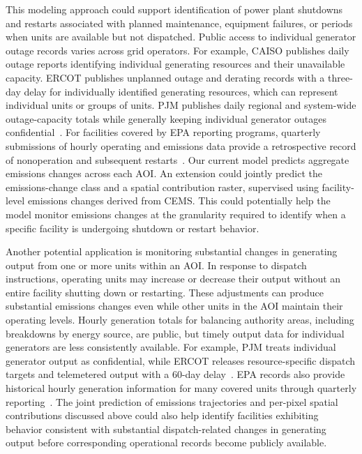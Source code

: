 \documentclass[sigconf,nonacm]{acmart}
\begin{document}
This modeling approach could support identification of power plant shutdowns and
restarts associated with planned maintenance, equipment failures, or periods when
units are available but not dispatched. Public access to individual generator
outage records varies across grid operators. For example, CAISO publishes daily
outage reports identifying individual generating resources and their unavailable
capacity. ERCOT publishes unplanned outage and derating records with a three-day
delay for individually identified generating resources, which can represent
individual units or groups of units. PJM publishes daily regional and system-wide
outage-capacity totals while generally keeping individual generator outages
confidential~\cite{caiso2026outages,ercot2026unplannedOutages,pjm2026dataAvailability}.
For facilities covered by EPA reporting programs, quarterly submissions of hourly
operating and emissions data provide a retrospective record of nonoperation and
subsequent restarts~\cite{epa2026powerSectorGuide,epa2026powerSectorData}. Our current
model predicts aggregate emissions changes across each AOI. An extension could
jointly predict the emissions-change class and a spatial contribution raster,
supervised using facility-level emissions changes derived from CEMS. This could
potentially help the model monitor emissions changes at the granularity required
to identify when a specific facility is undergoing shutdown or restart behavior.

Another potential application is monitoring substantial changes in generating
output from one or more units within an AOI. In response to dispatch instructions,
operating units may increase or decrease their output without an entire facility
shutting down or restarting. These adjustments can produce substantial emissions
changes even while other units in the AOI maintain their operating levels. Hourly
generation totals for balancing authority areas, including breakdowns by energy
source, are public, but timely output data for individual generators are less
consistently available. For example, PJM treats individual generator output as
confidential, while ERCOT releases resource-specific dispatch targets and
telemetered output with a 60-day delay~\cite{eia2026hourlyGrid,pjm2026dataAvailability,ercot2026dispatchDisclosure}.
EPA records also provide historical hourly generation information for many covered
units through quarterly reporting~\cite{epa2026powerSectorGuide,epa2026powerSectorData}.
The joint prediction of emissions trajectories and per-pixel spatial contributions
discussed above could also help identify facilities exhibiting behavior consistent
with substantial dispatch-related changes in generating output before corresponding
operational records become publicly available.
\end{document}

